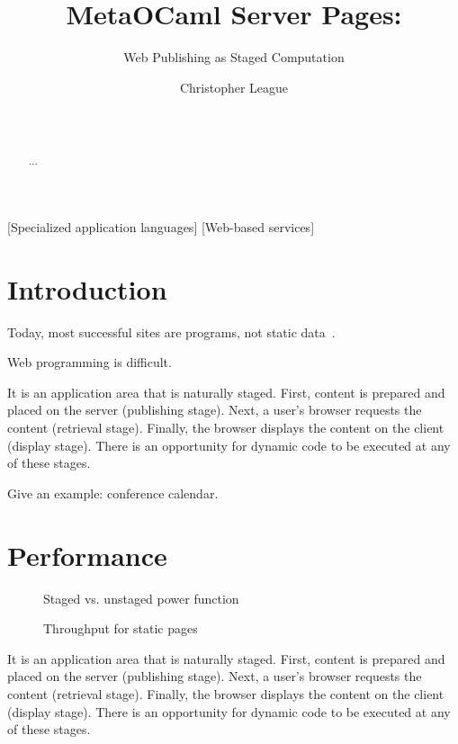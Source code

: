 \documentclass{acm_proc_article-sp}
\begin{document}
\title{MetaOCaml Server Pages:}
\subtitle{Web Publishing as Staged Computation}
\author{
  \alignauthor Christopher League\\
  \\
  \\
  }
\maketitle
\begin{abstract}
...
\end{abstract}
[Specialized application languages]
[Web-based services]
\section{Introduction}

Today, most successful sites are programs, not static
data~\cite{greenspun99panda}.

Web programming is difficult.

It is an application area that is naturally staged.  First, content is
prepared and placed on the server (publishing stage).  Next, a user's
browser requests the content (retrieval stage).  Finally, the browser
displays the content on the client (display stage).  There is an
opportunity for dynamic code to be executed at any of these stages.

Give an example: conference calendar.  

\section{Performance}

\begin{figure}[htbp]
  
  \caption{Staged vs. unstaged power function}
  \label{fig:power}
\end{figure}

\begin{figure}[htbp]
  
  \caption{Throughput for static pages}
  \label{fig:static}
\end{figure}


It is an application area that is naturally staged.  First, content is
prepared and placed on the server (publishing stage).  Next, a user's
browser requests the content (retrieval stage).  Finally, the browser
displays the content on the client (display stage).  There is an
opportunity for dynamic code to be executed at any of these stages.
\end{document}
